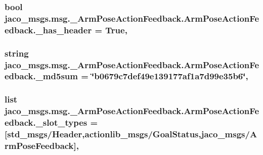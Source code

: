 \subsubsection[{\texorpdfstring{\+\_\+has\+\_\+header}{_has_header}}]{\setlength{\rightskip}{0pt plus 5cm}bool jaco\+\_\+msgs.\+msg.\+\_\+\+Arm\+Pose\+Action\+Feedback.\+Arm\+Pose\+Action\+Feedback.\+\_\+has\+\_\+header = True\hspace{0.3cm}{\ttfamily [static]}, {\ttfamily [private]}}\hypertarget{classjaco__msgs_1_1msg_1_1__ArmPoseActionFeedback_1_1ArmPoseActionFeedback_ade7415207299c3c525855c9b4ff0143e}{}\label{classjaco__msgs_1_1msg_1_1__ArmPoseActionFeedback_1_1ArmPoseActionFeedback_ade7415207299c3c525855c9b4ff0143e}
\subsubsection[{\texorpdfstring{\+\_\+md5sum}{_md5sum}}]{\setlength{\rightskip}{0pt plus 5cm}string jaco\+\_\+msgs.\+msg.\+\_\+\+Arm\+Pose\+Action\+Feedback.\+Arm\+Pose\+Action\+Feedback.\+\_\+md5sum = \char`\"{}b0679c7def49e139177af1a7d99e35b6\char`\"{}\hspace{0.3cm}{\ttfamily [static]}, {\ttfamily [private]}}\hypertarget{classjaco__msgs_1_1msg_1_1__ArmPoseActionFeedback_1_1ArmPoseActionFeedback_a1e7ab27dbeaeffc884dc439e74721690}{}\label{classjaco__msgs_1_1msg_1_1__ArmPoseActionFeedback_1_1ArmPoseActionFeedback_a1e7ab27dbeaeffc884dc439e74721690}
\subsubsection[{\texorpdfstring{\+\_\+slot\+\_\+types}{_slot_types}}]{\setlength{\rightskip}{0pt plus 5cm}list jaco\+\_\+msgs.\+msg.\+\_\+\+Arm\+Pose\+Action\+Feedback.\+Arm\+Pose\+Action\+Feedback.\+\_\+slot\+\_\+types = \mbox{[}\textquotesingle{}std\+\_\+msgs/Header\textquotesingle{},\textquotesingle{}actionlib\+\_\+msgs/Goal\+Status\textquotesingle{},\textquotesingle{}jaco\+\_\+msgs/{\bf Arm\+Pose\+Feedback}\textquotesingle{}\mbox{]}\hspace{0.3cm}{\ttfamily [static]}, {\ttfamily [private]}}\hypertarget{classjaco__msgs_1_1msg_1_1__ArmPoseActionFeedback_1_1ArmPoseActionFeedback_aa77c52e5e04a0af7d40d2c6e2fdf2493}{}\label{classjaco__msgs_1_1msg_1_1__ArmPoseActionFeedback_1_1ArmPoseActionFeedback_aa77c52e5e04a0af7d40d2c6e2fdf2493}



